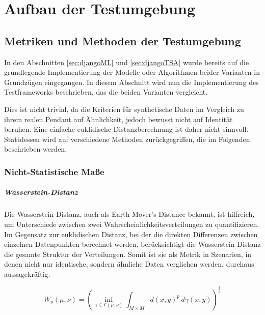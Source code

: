 
\chapter{Aufbau der Testumgebung}
\label{sec:testing}

\section{Metriken und Methoden der Testumgebung}
\label{sec:test_framework}

In den Abschnitten \ref{sec:djangoML} und \ref{sec:djangoTSA} wurde bereits auf die grundlegende Implementierung der Modelle oder Algorithmen beider Varianten in Grundzügen eingegangen. 
In diesem Abschnitt wird nun die Implementierung des Testframeworks beschrieben, das die beiden Varianten vergleicht.

Dies ist nicht trivial, da die Kriterien für synthetische Daten im Vergleich zu ihrem realen Pendant auf Ähnlichkeit, jedoch bewusst nicht auf Identität beruhen. 
Eine einfache euklidische Distanzberechnung ist daher nicht sinnvoll. Stattdessen wird auf verschiedene Methoden zurückgegriffen, die im Folgenden beschrieben werden.


\subsection{Nicht-Statistische Maße}
\label{sec:non_statistical_measures}

\paragraph{Wasserstein-Distanz}
Die Wasserstein-Distanz, auch als Earth Mover's Distance\cite{Understa51:online} bekannt, ist hilfreich, um Unterschiede zwischen zwei Wahrscheinlichkeitsverteilungen zu quantifizieren. 
Im Gegensatz zur euklidischen Distanz, bei der die direkten Differenzen zwischen einzelnen Datenpunkten berechnet werden, berücksichtigt die Wasserstein-Distanz die gesamte Struktur der Verteilungen. 
Somit ist sie als Metrik in Szenarien, in denen nicht nur identische, sondern ähnliche Daten verglichen werden, durchaus aussagekräftig.

\begin{equation}[Wasserstein-Distanz]
    \label{eq:wasserstein_distance}
    W_p(\mu, \nu) = \left( \inf_{\gamma \in \Gamma(\mu, \nu)} \int_{M \times M} d(x, y)^p \, d\gamma(x, y) \right)^{\frac{1}{p}}
\end{equation}

